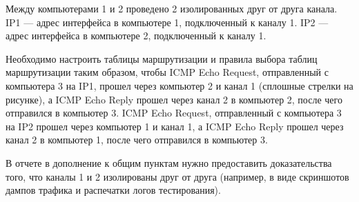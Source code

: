 \begin{center}
\end{center}

Между компьютерами 1 и 2 проведено 2 изолированных друг от друга канала.
IP1 --- адрес интерфейса в компьютере 1, подключенный к каналу 1.
IP2 --- адрес интерфейса в компьютере 2, подключенный к каналу 1.

Необходимо настроить таблицы маршрутизации и правила выбора таблиц маршрутизации таким образом,
чтобы ICMP Echo Request, отправленный с компьютера 3 на IP1,
прошел через компьютер 2 и канал 1 (сплошные стрелки на рисунке),
а ICMP Echo Reply прошел через канал 2 в компьютер 2, после чего отправился в компьютер 3.
ICMP Echo Request, отправленный с компьютера 3 на IP2 прошел через компьютер 1 и канал 1,
а ICMP Echo Reply прошел через канал 2 в компьютер 1, после чего отправился в компьютер 3.

В отчете в дополнение к общим пунктам нужно предоставить доказательства того,
что каналы 1 и 2 изолированы друг от друга (например,
в виде скриншотов дампов трафика и распечатки логов тестирования).
